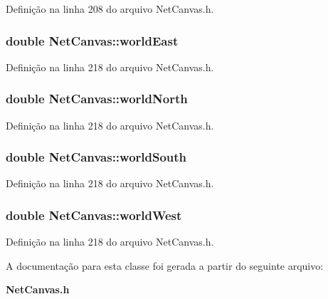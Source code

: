 Definição na linha 208 do arquivo Net\+Canvas.\+h.

\subsubsection[{world\+East}]{\setlength{\rightskip}{0pt plus 5cm}double Net\+Canvas\+::world\+East}\label{class_net_canvas_aa61f8a0efbb783a8a2c5e9f6ca1027c9}


Definição na linha 218 do arquivo Net\+Canvas.\+h.

\subsubsection[{world\+North}]{\setlength{\rightskip}{0pt plus 5cm}double Net\+Canvas\+::world\+North}\label{class_net_canvas_a6a3c4af3d80fa9356e1d7e28254be154}


Definição na linha 218 do arquivo Net\+Canvas.\+h.

\subsubsection[{world\+South}]{\setlength{\rightskip}{0pt plus 5cm}double Net\+Canvas\+::world\+South}\label{class_net_canvas_ad61bf02f9c25a56d2b25214c36db2211}


Definição na linha 218 do arquivo Net\+Canvas.\+h.

\subsubsection[{world\+West}]{\setlength{\rightskip}{0pt plus 5cm}double Net\+Canvas\+::world\+West}\label{class_net_canvas_aa8ed1465aea3a171caee40cdba97e3fa}


Definição na linha 218 do arquivo Net\+Canvas.\+h.



A documentação para esta classe foi gerada a partir do seguinte arquivo\+:\begin{DoxyCompactItemize}
\item 
{\bf Net\+Canvas.\+h}\end{DoxyCompactItemize}
